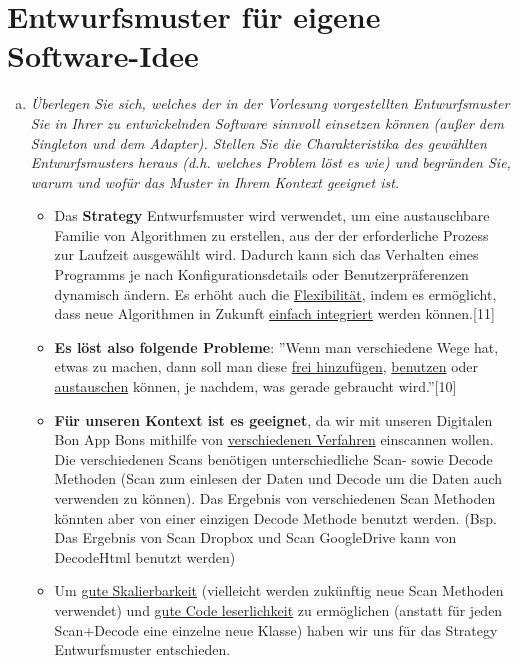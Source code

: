 \section{Entwurfsmuster für eigene Software-Idee}
\begin{enumerate}[(a)]
    \item {\itshape Überlegen Sie sich, welches der in der Vorlesung vorgestellten Entwurfsmuster Sie in Ihrer zu entwickelnden Software sinnvoll einsetzen können (außer dem Singleton und dem Adapter). Stellen Sie die Charakteristika des gewählten Entwurfsmusters heraus (d.h. welches Problem löst es wie) und begründen Sie, warum und wofür das Muster in Ihrem Kontext geeignet ist.}
    \begin{itemize}
        \item Das \textbf{Strategy} Entwurfsmuster wird verwendet, um eine austauschbare Familie von Algorithmen zu erstellen, aus der der erforderliche Prozess zur Laufzeit ausgewählt wird. Dadurch kann sich das Verhalten eines Programms je nach Konfigurationsdetails oder Benutzerpräferenzen dynamisch ändern. Es erhöht auch die \underline{Flexibilität}, indem es ermöglicht, dass neue Algorithmen in Zukunft \underline{einfach integriert} werden können.[11]
        \item \textbf{Es löst also folgende Probleme}: ''Wenn man verschiedene Wege hat, etwas zu machen, dann soll man diese \underline{frei hinzufügen}, \underline{benutzen} oder \underline{austauschen} können, je nachdem, was gerade gebraucht wird.''[10]
        
        \item \textbf{Für unseren Kontext ist es geeignet}, da wir mit unseren Digitalen Bon App Bons mithilfe von \underline{verschiedenen Verfahren} einscannen wollen. Die verschiedenen Scans benötigen unterschiedliche Scan- sowie Decode Methoden (Scan zum einlesen der Daten und Decode um die Daten auch verwenden zu können). Das Ergebnis von verschiedenen Scan Methoden könnten aber von einer einzigen Decode Methode benutzt werden. (Bsp. Das Ergebnis von Scan Dropbox und Scan GoogleDrive kann von DecodeHtml benutzt werden)

        \item Um \underline{gute Skalierbarkeit} (vielleicht werden zukünftig neue Scan Methoden verwendet) und \underline{gute Code leserlichkeit} zu ermöglichen (anstatt für jeden Scan+Decode eine einzelne neue Klasse) haben wir uns für das Strategy Entwurfsmuster entschieden. 


\end{itemize}
\end{enumerate}
